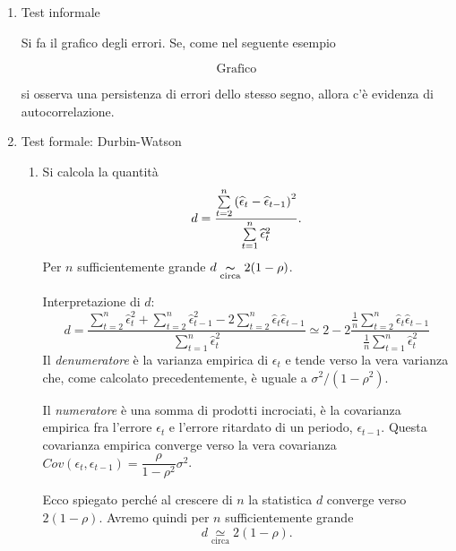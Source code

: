 \documentclass[a4paper]{report}
\newcounter{ese}
\theoremstyle{remark}
\begin{document}
\begin{enumerate}
\item Test informale

Si fa il grafico degli errori. Se, come nel seguente esempio \newpage

\begin{equation*}
\text{Grafico}
\end{equation*}%
\vspace{5cm}

si osserva una persistenza di errori dello stesso segno, allora c'\`{e}
evidenza di autocorrelazione.

\item Test formale: Durbin-Watson

\begin{enumerate}
\item Si calcola la quantit\`{a}%
\begin{equation*}
d=\frac{\sum\limits_{t=2}^{n}\left( \widehat{\epsilon }_{t}-\widehat{%
\epsilon }_{t-1}\right) ^{2}}{\sum\limits_{t=1}^{n}\widehat{\epsilon }%
_{t}^{2}}.
\end{equation*}%
Per $n$ sufficientemente grande $d\underset{\text{circa}}{\thicksim }%
2(1-\rho )$.

Interpretazione di $d$:%
\begin{equation*}
d=\frac{\sum\limits_{t=2}^{n}\widehat{\epsilon }_{t}^{2}+\sum%
\limits_{t=2}^{n}\widehat{\epsilon }_{t-1}^{2}-2\sum\limits_{t=2}^{n}%
\widehat{\epsilon }_{t}\widehat{\epsilon }_{t-1}}{\sum\limits_{t=1}^{n}%
\widehat{\epsilon }_{t}^{2}}\simeq 2-2\frac{\frac{1}{n}\sum\limits_{t=2}^{n}%
\widehat{\epsilon }_{t}\widehat{\epsilon }_{t-1}}{\frac{1}{n}%
\sum\limits_{t=1}^{n}\widehat{\epsilon }_{t}^{2}}
\end{equation*}%
Il \emph{denumeratore} \`{e} la varianza empirica di $\epsilon _{t}$ e tende
verso la vera varianza che, come calcolato precedentemente, \`{e} uguale a $%
\sigma ^{2}/\left( 1-\rho ^{2}\right) $.

Il \emph{numeratore} \`{e} una somma di prodotti incrociati, \`{e} la
covarianza empirica fra l'errore $\epsilon _{t}$ e l'errore ritardato di un
periodo, $\epsilon _{t-1}$. Questa covarianza empirica converge verso la
vera covarianza $Cov(\epsilon _{t},\epsilon _{t-1})=\dfrac{\rho }{1-\rho ^{2}%
}\sigma ^{2}$.

Ecco spiegato perch\'{e} al crescere di $n$ la statistica $d$ converge verso 
$2(1-\rho )$. Avremo quindi per $n$ sufficientemente grande 
\begin{equation}
d\underset{\text{circa}}{\simeq }2(1-\rho ).  \label{d_circa}
\end{equation}


\end{enumerate}
\end{enumerate}
\end{document}
